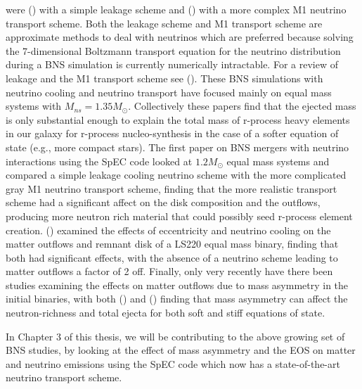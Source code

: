 were (\cite{neilsen2014magnetized, palenzuela2015effects}) with a simple leakage scheme and (\cite{sekiguchi2015dynamical}) with a more complex M1 neutrino transport scheme. Both the leakage scheme and M1 transport scheme are approximate methods to deal with neutrinos which are preferred because solving the 7-dimensional Boltzmann transport equation for the neutrino distribution during a BNS simulation is currently numerically intractable. For a review of leakage and the M1 transport scheme see (\cite{foucart2015post}). These BNS simulations with neutrino cooling and neutrino transport have focused mainly on equal mass systems with $M_{ns} = 1.35M_{\odot}$. Collectively these papers find that the ejected mass is only substantial  enough to explain the total mass of r-process heavy elements in our galaxy for r-process nucleo-synthesis in the case of a softer equation of state (e.g., more compact stars). The first paper on BNS mergers with neutrino interactions using the SpEC code looked at $1.2M_{\odot}$ equal mass systems and compared a simple leakage cooling neutrino scheme with the more complicated gray M1 neutrino transport scheme, finding that the more realistic transport scheme had a significant affect on the disk composition and the outflows, producing more neutron rich material that could possibly seed r-process element creation. (\cite{radice2016dynamical}) examined the effects of eccentricity and neutrino cooling on the matter outflows and remnant disk of a LS220 equal mass binary, finding that both had significant effects, with the absence of a neutrino scheme leading to matter outflows a factor of 2 off. Finally, only very recently have there been studies examining the effects on matter outflows due to mass asymmetry in the initial binaries, with both (\cite{lehner2016unequal}) and (\cite{sekiguchi2016dynamical}) finding that mass asymmetry can affect the neutron-richness and total ejecta for both soft and stiff equations of state.

In Chapter 3 of this thesis, we will be contributing to the above growing set of BNS studies, by looking at the effect of mass asymmetry and the EOS on matter and neutrino emissions using the SpEC code which now has a state-of-the-art neutrino transport scheme.

